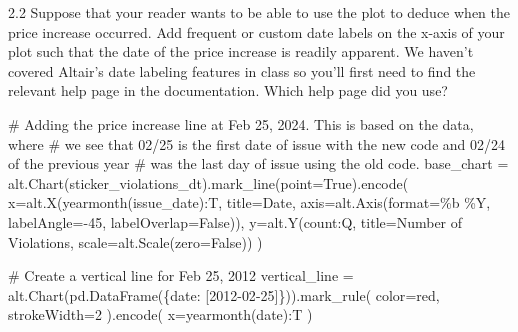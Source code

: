 \documentclass[
  letterpaper,
  DIV=11,
  numbers=noendperiod]{scrartcl}
\newenvironment{Shaded}{\begin{snugshade}}{\end{snugshade}}
\newcommand{\BuiltInTok}[1]{\textcolor[rgb]{0.00,0.23,0.31}{#1}}
\newcommand{\CommentTok}[1]{\textcolor[rgb]{0.37,0.37,0.37}{#1}}
\newcommand{\DecValTok}[1]{\textcolor[rgb]{0.68,0.00,0.00}{#1}}
\newcommand{\NormalTok}[1]{\textcolor[rgb]{0.00,0.23,0.31}{#1}}
\newcommand{\OperatorTok}[1]{\textcolor[rgb]{0.37,0.37,0.37}{#1}}
\newcommand{\StringTok}[1]{\textcolor[rgb]{0.13,0.47,0.30}{#1}}
\newcommand{\VariableTok}[1]{\textcolor[rgb]{0.07,0.07,0.07}{#1}}
\begin{document}
2.2 Suppose that your reader wants to be able to use the plot to deduce
when the price increase occurred. Add frequent or custom date labels on
the x-axis of your plot such that the date of the price increase is
readily apparent. We haven't covered Altair's date labeling features in
class so you'll first need to find the relevant help page in the
documentation. Which help page did you use?

\begin{Shaded}
\begin{Highlighting}[]
\CommentTok{\# Adding the price increase line at Feb 25, 2024. This is based on the data, where}
\CommentTok{\# we see that 02/25 is the first date of issue with the new code and 02/24 of the previous year}
\CommentTok{\# was the last day of issue using the old code.}
\NormalTok{base\_chart }\OperatorTok{=}\NormalTok{ alt.Chart(sticker\_violations\_dt).mark\_line(point}\OperatorTok{=}\VariableTok{True}\NormalTok{).encode(}
\NormalTok{    x}\OperatorTok{=}\NormalTok{alt.X(}\StringTok{\textquotesingle{}yearmonth(issue\_date):T\textquotesingle{}}\NormalTok{, }
\NormalTok{            title}\OperatorTok{=}\StringTok{\textquotesingle{}Date\textquotesingle{}}\NormalTok{,}
\NormalTok{            axis}\OperatorTok{=}\NormalTok{alt.Axis(}\BuiltInTok{format}\OperatorTok{=}\StringTok{\textquotesingle{}\%b \%Y\textquotesingle{}}\NormalTok{, labelAngle}\OperatorTok{={-}}\DecValTok{45}\NormalTok{, labelOverlap}\OperatorTok{=}\VariableTok{False}\NormalTok{)),}
\NormalTok{    y}\OperatorTok{=}\NormalTok{alt.Y(}\StringTok{\textquotesingle{}count:Q\textquotesingle{}}\NormalTok{, }
\NormalTok{            title}\OperatorTok{=}\StringTok{\textquotesingle{}Number of Violations\textquotesingle{}}\NormalTok{,}
\NormalTok{            scale}\OperatorTok{=}\NormalTok{alt.Scale(zero}\OperatorTok{=}\VariableTok{False}\NormalTok{))}
\NormalTok{)}

\CommentTok{\# Create a vertical line for Feb 25, 2012}
\NormalTok{vertical\_line }\OperatorTok{=}\NormalTok{ alt.Chart(pd.DataFrame(\{}\StringTok{\textquotesingle{}date\textquotesingle{}}\NormalTok{: [}\StringTok{\textquotesingle{}2012{-}02{-}25\textquotesingle{}}\NormalTok{]\})).mark\_rule(}
\NormalTok{    color}\OperatorTok{=}\StringTok{\textquotesingle{}red\textquotesingle{}}\NormalTok{,}
\NormalTok{    strokeWidth}\OperatorTok{=}\DecValTok{2}
\NormalTok{).encode(}
\NormalTok{    x}\OperatorTok{=}\StringTok{\textquotesingle{}yearmonth(date):T\textquotesingle{}}
\NormalTok{)}


\end{Highlighting}
\end{Shaded}
\end{document}
